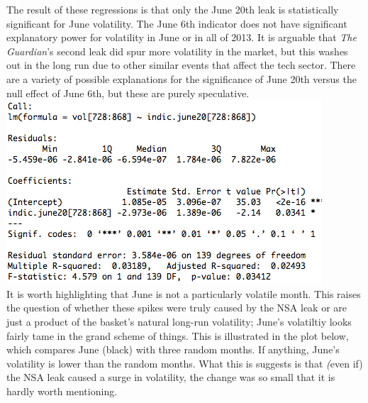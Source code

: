 \documentclass[11pt]{amsart}
\begin{document}
\newpage
The result of these regressions is that only the June 20th leak is statistically significant for June volatility. The June 6th indicator does not have significant explanatory power for volatility in June or in all of 2013. It is arguable that \textit{The Guardian}'s second leak did spur more volatility in the market, but this washes out in the long run due to other similar events that affect the tech sector. There are a variety of possible explanations for the significance of June 20th versus the  null effect of June 6th, but these are purely speculative. \\

\includegraphics[scale=0.6]{june_20_june_11_25.png} \\

\newpage
It is worth highlighting that June is not a particularly volatile month. This raises the question of whether these spikes were truly caused by the NSA leak or are just a product of the basket's natural long-run volatility; June's volatiltiy looks fairly tame in the grand scheme of things. This is illustrated in the plot below, which compares June (black) with three random months. If anything, June's volatility is lower than the random months. What this is suggests is that \textit(even if) the NSA leak caused a surge in volatility, the change was so small that it is hardly worth mentioning. \\
\end{document}
